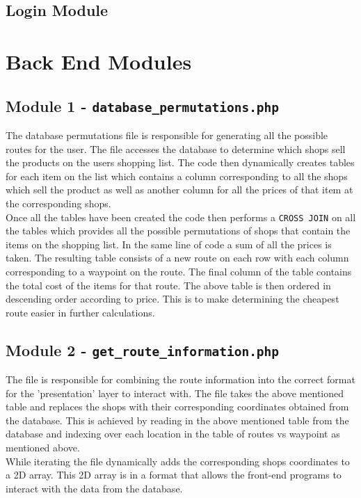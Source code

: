 \documentclass[10pt, a4paper, twocolumn]{scrartcl}
\begin{document}
		\subsection{Login Module}
	
	\section{Back End Modules}
		 
			\subsection{Module 1 - \texttt{database\_permutations.php}}
			
				The database permutations file is responsible for generating all the possible routes for the user. The file accesses the database to determine which shops sell the products on the users shopping list. The code then dynamically creates tables for each item on the list which contains a column corresponding to all the shops which sell the product as well as another column for all the prices of that item at the corresponding shops. \\
				
				Once all the tables have been created the code then performs a \texttt{CROSS JOIN} on all the tables which provides all the possible permutations of shops that contain the items on the shopping list. In the same line of code a sum of all the prices is taken. The resulting table consists of a new route on each row with each column corresponding to a waypoint on the route. The final column of the table contains the total cost of the items for that route. The above table is then ordered in descending order according to price. This is to make determining the cheapest route easier in further calculations. 
			
			\subsection{Module 2 - \texttt{get\_route\_information.php}}
			
				The file is responsible for combining the route information into the correct format for the 'presentation' layer to interact with. The file takes the above mentioned table and replaces the shops with their corresponding coordinates obtained from the database. This is achieved by reading in the above mentioned table from the database and indexing over each location in the table of routes vs waypoint as mentioned above. \\
				
				While iterating the file dynamically adds the corresponding shops coordinates to a 2D array. This 2D array is in a format that allows the front-end programs to interact with the data from the database. 
	
\end{document}
